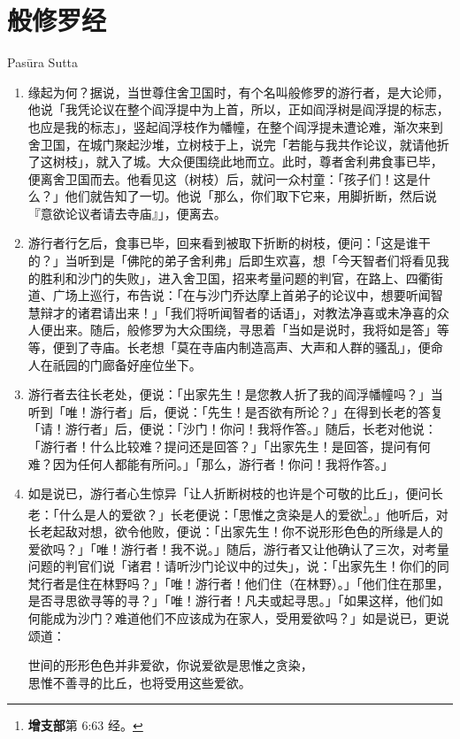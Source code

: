 \section{般修罗经}

\begin{center}Pasūra Sutta\end{center}\vspace{1em}

\begin{enumerate}\item 缘起为何？据说，当世尊住舍卫国时，有个名叫般修罗的游行者，是大论师，他说「我凭论议在整个阎浮提中为上首，所以，正如阎浮树是阎浮提的标志，也应是我的标志」，竖起阎浮枝作为幡幢，在整个阎浮提未遭论难，渐次来到舍卫国，在城门聚起沙堆，立树枝于上，说完「若能与我共作论议，就请他折了这树枝」，就入了城。大众便围绕此地而立。此时，尊者舍利弗食事已毕，便离舍卫国而去。他看见这（树枝）后，就问一众村童：「孩子们！这是什么？」他们就告知了一切。他说「那么，你们取下它来，用脚折断，然后说『意欲论议者请去寺庙』」，便离去。
\item 游行者行乞后，食事已毕，回来看到被取下折断的树枝，便问：「这是谁干的？」当听到是「佛陀的弟子舍利弗」后即生欢喜，想「今天智者们将看见我的胜利和沙门的失败」，进入舍卫国，招来考量问题的判官，在路上、四衢街道、广场上巡行，布告说：「在与沙门乔达摩上首弟子的论议中，想要听闻智慧辩才的诸君请出来！」「我们将听闻智者的话语」，对教法净喜或未净喜的众人便出来。随后，般修罗为大众围绕，寻思着「当如是说时，我将如是答」等等，便到了寺庙。长老想「莫在寺庙内制造高声、大声和人群的骚乱」，便命人在祇园的门廊备好座位坐下。
\item 游行者去往长老处，便说：「出家先生！是您教人折了我的阎浮幡幢吗？」当听到「唯！游行者」后，便说：「先生！是否欲有所论？」在得到长老的答复「请！游行者」后，便说：「沙门！你问！我将作答。」随后，长老对他说：「游行者！什么比较难？提问还是回答？」「出家先生！是回答，提问有何难？因为任何人都能有所问。」「那么，游行者！你问！我将作答。」
\item 如是说已，游行者心生惊异「让人折断树枝的也许是个可敬的比丘」，便问长老：「什么是人的爱欲？」长老便说：「思惟之贪染是人的爱欲\footnote{\textbf{增支部}第 6:63 经。}。」他听后，对长老起敌对想，欲令他败，便说：「出家先生！你不说形形色色的所缘是人的爱欲吗？」「唯！游行者！我不说。」随后，游行者又让他确认了三次，对考量问题的判官们说「诸君！请听沙门论议中的过失」，说：「出家先生！你们的同梵行者是住在林野吗？」「唯！游行者！他们住（在林野）。」「他们住在那里，是否寻思欲寻等的寻？」「唯！游行者！凡夫或起寻思。」「如果这样，他们如何能成为沙门？难道他们不应该成为在家人，受用爱欲吗？」如是说已，更说颂道：\begin{quoting}世间的形形色色并非爱欲，你说爱欲是思惟之贪染，\\思惟不善寻的比丘，也将受用这些爱欲。\end{quoting}

\end{enumerate}
